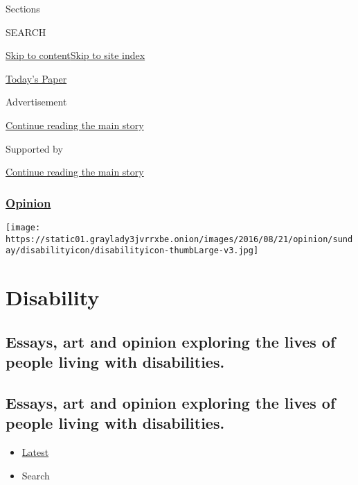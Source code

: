 Sections

SEARCH

\protect\hyperlink{site-content}{Skip to
content}\protect\hyperlink{site-index}{Skip to site index}

\href{https://myaccount.nytimes3xbfgragh.onion/auth/login?response_type=cookie\&client_id=vi}{}

\href{https://www.nytimes3xbfgragh.onion/section/todayspaper}{Today's
Paper}

Advertisement

\protect\hyperlink{after-top}{Continue reading the main story}

Supported by

\protect\hyperlink{after-sponsor}{Continue reading the main story}

\hypertarget{opinion}{%
\subsubsection{\texorpdfstring{\href{/section/opinion}{Opinion}}{Opinion}}\label{opinion}}

\texttt{[image: https://static01.graylady3jvrrxbe.onion/images/2016/08/21/opinion/sunday/disabilityicon/disabilityicon-thumbLarge-v3.jpg]}

\hypertarget{disability}{%
\section{Disability}\label{disability}}

\hypertarget{essays-art-and-opinion-exploring-the-lives-of-people-living-with-disabilities}{%
\subsection{Essays, art and opinion exploring the lives of people living
with
disabilities.}\label{essays-art-and-opinion-exploring-the-lives-of-people-living-with-disabilities}}

\hypertarget{essays-art-and-opinion-exploring-the-lives-of-people-living-with-disabilities-1}{%
\subsection{Essays, art and opinion exploring the lives of people living
with
disabilities.}\label{essays-art-and-opinion-exploring-the-lives-of-people-living-with-disabilities-1}}

\begin{itemize}
\tightlist
\item
  \protect\hyperlink{stream-panel}{Latest}
\item
  Search
\end{itemize}

